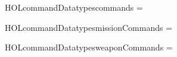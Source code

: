 \newcommand{\HOLcommandDate}{20 August 2016}
\newcommand{\HOLcommandTime}{11:38}
\begin{SaveVerbatim}{HOLcommandDatatypescommands}
 =   \HOLTokenBar{}  
\end{SaveVerbatim}
\newcommand{\HOLcommandDatatypescommands}{\UseVerbatim{HOLcommandDatatypescommands}}
\begin{SaveVerbatim}{HOLcommandDatatypesmissionCommands}
 =  \HOLTokenBar{} 
\end{SaveVerbatim}
\newcommand{\HOLcommandDatatypesmissionCommands}{\UseVerbatim{HOLcommandDatatypesmissionCommands}}
\begin{SaveVerbatim}{HOLcommandDatatypesweaponCommands}
 =  \HOLTokenBar{} 
\end{SaveVerbatim}
\newcommand{\HOLcommandDatatypesweaponCommands}{\UseVerbatim{HOLcommandDatatypesweaponCommands}}
\newcommand{\HOLcommandDatatypes}{
\HOLcommandDatatypescommands\HOLcommandDatatypesmissionCommands\HOLcommandDatatypesweaponCommands}
